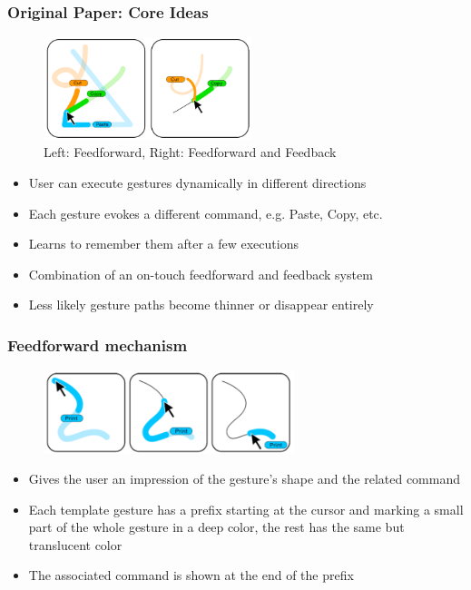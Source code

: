 \documentclass{beamer}
\begin{document}
\begin{frame}
\frametitle{Original Paper: Core Ideas}

\begin{figure}
\centering
\includegraphics[width=0.54\textwidth]{ffpaths12.png}
	\caption{Left: Feedforward, Right: Feedforward and Feedback}
\end{figure}
\begin{itemize}
\item User can execute gestures dynamically in different directions
\pause
\item Each gesture evokes a different command, e.g. Paste, Copy, etc.
\pause
\item Learns to remember them after a few executions
\pause
\item Combination of an on-touch feedforward and feedback system
\pause
\item Less likely gesture paths become thinner or disappear entirely
\pause
\end{itemize}


\end{frame}

\begin{frame}
\frametitle{Feedforward mechanism}

\begin{figure}[H]
\centering
\includegraphics[width=0.65\textwidth]{ff.png}
\end{figure}

\begin{itemize}
\item Gives the user an impression of the gesture's shape and the related command
\pause
\item Each template gesture has a prefix starting at the cursor and marking a small part of the whole gesture in a deep color, the rest has the same but translucent color
\pause
\item The associated command is shown at the end of the prefix
\end{itemize}
\end{frame}
\end{document}
